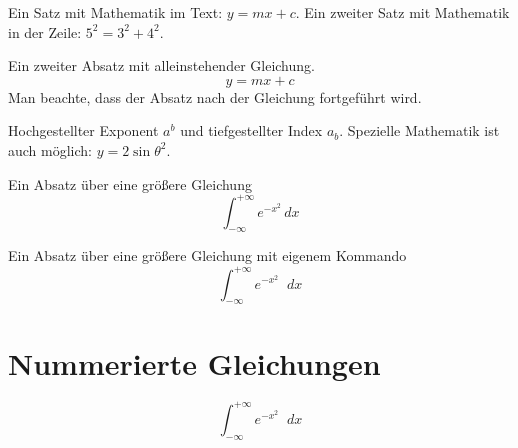 \documentclass{article}
\newcommand{\diff}{\mathop{}\!d}            %
\begin{document}
Ein Satz mit Mathematik im Text: \(y = mx + c\).
Ein zweiter Satz mit Mathematik in der Zeile: \(5^{2}=3^{2}+4^{2}\).

Ein zweiter Absatz mit alleinstehender Gleichung.
\[
    y = mx + c
\]
Man beachte, dass der Absatz nach der Gleichung fortgeführt wird.

Hochgestellter Exponent \(a^{b}\) und tiefgestellter Index \(a_{b}\). Spezielle Mathematik ist auch möglich: \(y = 2 \sin \theta^{2}\).

Ein Absatz über eine größere Gleichung
\[
    \int_{-\infty}^{+\infty} e^{-x^2} \, dx
\]

Ein Absatz über eine größere Gleichung mit eigenem Kommando
\[
    \int_{-\infty}^{+\infty} e^{-x^2} \diff x
\]

\section{Nummerierte Gleichungen}

\begin{equation}
    \int_{-\infty}^{+\infty} e^{-x^2} \diff x
\end{equation}
\end{document}
